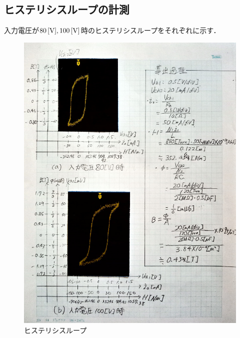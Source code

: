 \subsection{ヒステリシスループの計測}
入力電圧が$80\,[\rm{V}], 100\,[\rm{V}]$時のヒステリシスループをそれぞれに示す．
\begin{figure}[h]
	\centering
	\includegraphics[scale=0.8]{./data/graph/2.pdf}
	\caption{ヒステリシスループ}
	\label{fig:2}
\end{figure}

